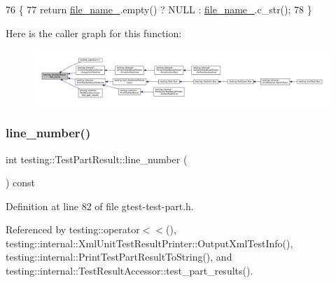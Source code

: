 \begin{DoxyCode}
76                                 \{
77     \textcolor{keywordflow}{return} \hyperlink{classtesting_1_1TestPartResult_abf5ab5fc171dc6248579a44353385df6}{file\_name\_}.empty() ? NULL : \hyperlink{classtesting_1_1TestPartResult_abf5ab5fc171dc6248579a44353385df6}{file\_name\_}.c\_str();
78   \}
\end{DoxyCode}
Here is the caller graph for this function\+:
\nopagebreak
\begin{figure}[H]
\begin{center}
\leavevmode
\includegraphics[width=350pt]{classtesting_1_1TestPartResult_a0be40512f50a0086c4d3dc43938978aa_icgraph}
\end{center}
\end{figure}
\mbox{\label{classtesting_1_1TestPartResult_ad4c5da5f13245ac18cf256d0d9f3eda9}} 
\subsubsection{\texorpdfstring{line\+\_\+number()}{line\_number()}}
{\footnotesize\ttfamily int testing\+::\+Test\+Part\+Result\+::line\+\_\+number (\begin{DoxyParamCaption}{ }\end{DoxyParamCaption}) const\hspace{0.3cm}{\ttfamily [inline]}}



Definition at line 82 of file gtest-\/test-\/part.\+h.



Referenced by testing\+::operator$<$$<$(), testing\+::internal\+::\+Xml\+Unit\+Test\+Result\+Printer\+::\+Output\+Xml\+Test\+Info(), testing\+::internal\+::\+Print\+Test\+Part\+Result\+To\+String(), and testing\+::internal\+::\+Test\+Result\+Accessor\+::test\+\_\+part\+\_\+results().


